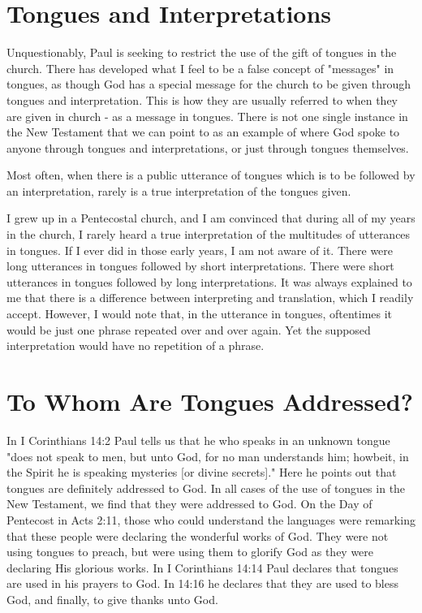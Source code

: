 \section*{Tongues and Interpretations}

Unquestionably, Paul is seeking to restrict the use of the gift of tongues in the church. There has developed what I feel to be a false concept of "messages" in tongues, as though God has a special message for the church to be given through tongues and interpretation. This is how they are usually referred to when they are given in church - as a message in tongues. There is not one single instance in the New Testament that we can point to as an example of where God spoke to anyone through tongues and interpretations, or just through tongues themselves. 

Most often, when there is a public utterance of tongues which is to be followed by an interpretation, rarely is a true interpretation of the tongues given. 

I grew up in a Pentecostal church, and I am convinced that during all of my years in the church, I rarely heard a true interpretation of the multitudes of utterances in tongues. If I ever did in those early years, I am not aware of it. There were long utterances in tongues followed by short interpretations. There were short utterances in tongues followed by long interpretations. It was always explained to me that there is a difference between interpreting and translation, which I readily accept. However, I would note that, in the utterance in tongues, oftentimes it would be just one phrase repeated over and over again. Yet the supposed interpretation would have no repetition of a phrase. 

\section*{To Whom Are Tongues Addressed?}

In I Corinthians 14:2 Paul tells us that he who speaks in an unknown tongue "does not speak to men, but unto God, for no man understands him; howbeit, in the Spirit he is speaking mysteries [or divine secrets]." Here he points out that tongues are definitely addressed to God. In all cases of the use of tongues in the New Testament, we find that they were addressed to God. On the Day of Pentecost in Acts 2:11, those who could understand the languages were remarking that these people were declaring the wonderful works of God. They were not using tongues to preach, but were using them to glorify God as they were declaring His glorious works. In I Corinthians 14:14 Paul declares that tongues are used in his prayers to God. In 14:16 he declares that they are used to bless God, and finally, to give thanks unto God. 

